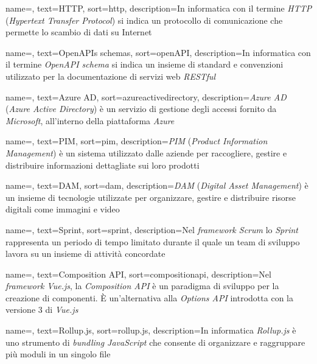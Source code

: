 {
    name=,
    text=HTTP,
    sort=http,
    description={In informatica con il termine \emph{HTTP} (\emph{Hypertext Transfer Protocol}) si indica un protocollo di comunicazione che permette lo scambio di dati su Internet}
}

 {
    name=,
    text=OpenAPIs schemas,
    sort=openAPI,
    description={In informatica con il termine \emph{OpenAPI schema} si indica un insieme di standard e convenzioni utilizzato per la documentazione di servizi web \emph{RESTful}}
}

 {
    name=,
    text=Azure AD,
    sort=azureactivedirectory,
    description={\emph{Azure AD} (\emph{Azure Active Directory}) è un servizio di gestione degli accessi fornito da \emph{Microsoft}, all'interno della piattaforma \emph{Azure}}
}

 {
    name=,
    text=PIM,
    sort=pim,
    description={\emph{PIM} (\emph{Product Information Management}) è un sistema utilizzato dalle aziende per raccogliere, gestire e distribuire informazioni dettagliate sui loro prodotti}
}

 {
    name=,
    text=DAM,
    sort=dam,
    description={\emph{DAM} (\emph{Digital Asset Management}) è un insieme di tecnologie utilizzate per organizzare, gestire e distribuire risorse digitali come immagini e video}
}


 {
    name=,
    text=Sprint,
    sort=sprint,
    description={Nel \emph{framework Scrum} lo \emph{Sprint} rappresenta un periodo di tempo limitato durante il quale un team di sviluppo lavora su un insieme di attività concordate}
}

 {
    name=,
    text=Composition API,
    sort=compositionapi,
    description={Nel \emph{framework Vue.js}, la \emph{Composition API} è un paradigma di sviluppo per la creazione di componenti. È un'alternativa alla \emph{Options API} introdotta con la versione 3 di \emph{Vue.js}}
}

 {
    name=,
    text=Rollup.js,
    sort=rollup.js,
    description={In informatica \emph{Rollup.js} è uno strumento di \emph{bundling JavaScript} che consente di organizzare e raggruppare più moduli in un singolo file}
}

